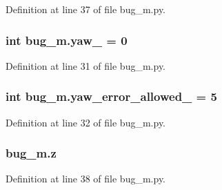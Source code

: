 Definition at line 37 of file bug\+\_\+m.\+py.

\subsubsection[{\texorpdfstring{yaw\+\_\+}{yaw_}}]{\setlength{\rightskip}{0pt plus 5cm}int bug\+\_\+m.\+yaw\+\_\+ = 0}\hypertarget{namespacebug__m_a8b5b5c9259592b8efd526c5adb95d95b}{}\label{namespacebug__m_a8b5b5c9259592b8efd526c5adb95d95b}


Definition at line 31 of file bug\+\_\+m.\+py.

\subsubsection[{\texorpdfstring{yaw\+\_\+error\+\_\+allowed\+\_\+}{yaw_error_allowed_}}]{\setlength{\rightskip}{0pt plus 5cm}int bug\+\_\+m.\+yaw\+\_\+error\+\_\+allowed\+\_\+ = 5}\hypertarget{namespacebug__m_a23e5e76f14d9d0d139767cb229a53dda}{}\label{namespacebug__m_a23e5e76f14d9d0d139767cb229a53dda}


Definition at line 32 of file bug\+\_\+m.\+py.

\subsubsection[{\texorpdfstring{z}{z}}]{\setlength{\rightskip}{0pt plus 5cm}bug\+\_\+m.\+z}\hypertarget{namespacebug__m_afbb54887da57b97920c8d36c6daed1fc}{}\label{namespacebug__m_afbb54887da57b97920c8d36c6daed1fc}


Definition at line 38 of file bug\+\_\+m.\+py.

